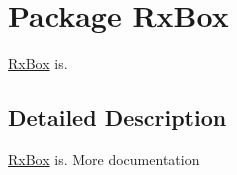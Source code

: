 \hypertarget{namespace_rx_box}{
\section{Package RxBox}
\label{namespace_rx_box}
}


\hyperlink{namespace_rx_box}{RxBox} is.  




\subsection{Detailed Description}
\hyperlink{namespace_rx_box}{RxBox} is. More documentation 